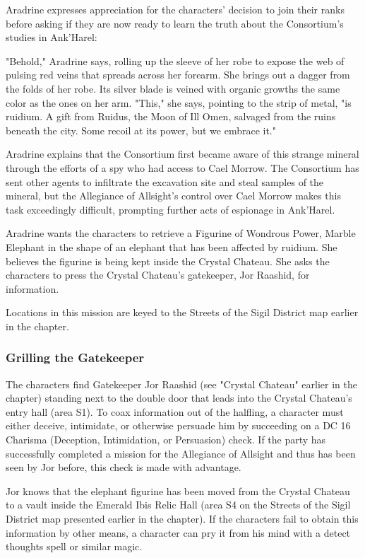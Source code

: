\documentclass[10pt,a4paper,twoside,twocolumn,openany,nodeprecatedcode]{dndbook}
\begin{document}
Aradrine expresses appreciation for the characters' decision to join their ranks before asking if they are now ready to learn the truth about the Consortium's studies in Ank'Harel:

\begin{DndReadAloud}{}
"Behold," Aradrine says, rolling up the sleeve of her robe to expose the web of pulsing red veins that spreads across her forearm. She brings out a dagger from the folds of her robe. Its silver blade is veined with organic growths the same color as the ones on her arm. "This," she says, pointing to the strip of metal, "is ruidium. A gift from Ruidus, the Moon of Ill Omen, salvaged from the ruins beneath the city. Some recoil at its power, but we embrace it."

\end{DndReadAloud}

Aradrine explains that the Consortium first became aware of this strange mineral through the efforts of a spy who had access to Cael Morrow. The Consortium has sent other agents to infiltrate the excavation site and steal samples of the mineral, but the Allegiance of Allsight's control over Cael Morrow makes this task exceedingly difficult, prompting further acts of espionage in Ank'Harel.

Aradrine wants the characters to retrieve a Figurine of Wondrous Power, Marble Elephant in the shape of an elephant that has been affected by ruidium. She believes the figurine is being kept inside the Crystal Chateau. She asks the characters to press the Crystal Chateau's gatekeeper, Jor Raashid, for information.

Locations in this mission are keyed to the Streets of the Sigil District map earlier in the chapter.

\subsubsection{Grilling the Gatekeeper}
The characters find Gatekeeper Jor Raashid (see "Crystal Chateau" earlier in the chapter) standing next to the double door that leads into the Crystal Chateau's entry hall (area S1). To coax information out of the halfling, a character must either deceive, intimidate, or otherwise persuade him by succeeding on a DC 16 Charisma (Deception, Intimidation, or Persuasion) check. If the party has successfully completed a mission for the Allegiance of Allsight and thus has been seen by Jor before, this check is made with advantage.

Jor knows that the elephant figurine has been moved from the Crystal Chateau to a vault inside the Emerald Ibis Relic Hall (area S4 on the Streets of the Sigil District map presented earlier in the chapter). If the characters fail to obtain this information by other means, a character can pry it from his mind with a detect thoughts spell or similar magic.
\end{document}
